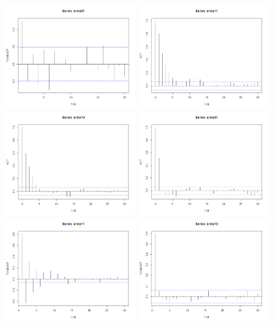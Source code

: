 \documentclass{article}
\begin{document}
\begin{CJK*}{GBK}{song}
\begin{enumerate}
\begin{center}
\includegraphics[width=5cm]{6.png}
\includegraphics[width=5cm]{11.png}
\includegraphics[width=5cm]{21.png}
\includegraphics[width=5cm]{31.png}
\includegraphics[width=5cm]{41.png}
\includegraphics[width=5cm]{51.png}

\end{center}
\end{enumerate}
\end{CJK*}
\end{document}
